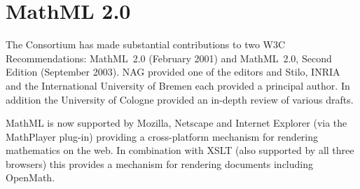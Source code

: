\section{MathML 2.0}

The Consortium has made substantial contributions to two W3C
Recommendations: MathML~2.0 (February 2001) and MathML~2.0, Second
Edition (September 2003).  NAG provided one of the editors and Stilo,
INRIA and the International University of Bremen each provided a
principal author.  In addition the University of Cologne provided an
in-depth review of various drafts.

MathML is now supported by Mozilla, Netscape and Internet Explorer (via
the MathPlayer plug-in) providing a cross-platform mechanism for
rendering mathematics on the web.  In combination with XSLT (also
supported by all three browsers) this provides a mechanism for rendering
documents including OpenMath.
